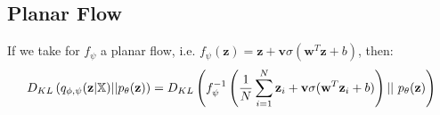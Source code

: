 \documentclass[english]{article}
\begin{document}
    \subsection*{Planar Flow}
    If we take for $f_{\psi}$ a planar flow, i.e. $f_{\psi}(\textbf{z}) = \textbf{z} + \textbf{v}\sigma (\textbf{w}^T\textbf{z} + b)$, then:
    \begin{equation}
        D_{KL} \left( q_{\phi, \psi}(\textbf{z}|\mathbb{X}) || p_{\theta}(\textbf{z}) \right) = D_{KL} \left(f_{\psi}^{-1}\left( \frac{1}{N} \sum ^N _{i=1} \textbf{z}_i +\textbf{v} \sigma (\textbf{w}^T \textbf{z}_i +b) \right) ||\ p_{\theta}(\textbf{z}) \right)
    \end{equation}
    
\newpage

\printbibliography
\end{document}
